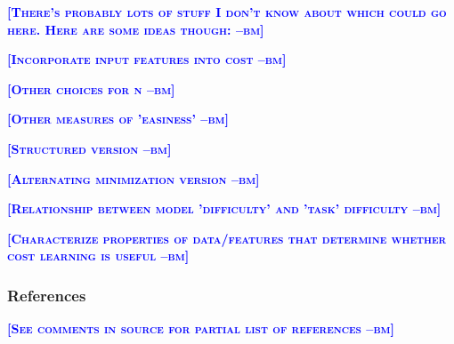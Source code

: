 \documentclass{article} %
\newcommand{\bmcomment}[1]{\textcolor{blue}{\textsc{\textbf{[#1 --bm]}}}}
\begin{document}
\bmcomment{There's probably lots of stuff I don't know about
which could go here.  Here are some ideas though:}

\bmcomment{Incorporate input features into cost}

\bmcomment{Other choices for n}

\bmcomment{Other measures of 'easiness'}

\bmcomment{Structured version}

\bmcomment{Alternating minimization version}

\bmcomment{Relationship between model 'difficulty' and 'task' difficulty}

\bmcomment{Characterize properties of data/features that determine whether cost learning is useful}



\subsubsection*{References}

\bmcomment{See comments in source for partial list of references}
\end{document}
